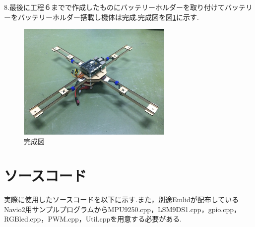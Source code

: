 \documentclass[12pt,oneside]{sotsuken_paper}
\begin{document}
\newpage

8.最後に工程６までで作成したものにバッテリーホルダーを取り付けてバッテリーをバッテリーホルダー搭載し機体は完成.完成図を図\ref{fig:kitai}に示す.

\begin{figure}[htbp]
	\begin{center}
		\includegraphics[width=75mm]{image/kitai/kitai.jpg}
		\caption{完成図}
		\label{fig:kitai}
	\end{center}
\end{figure}

\clearpage

\section{ソースコード}
実際に使用したソースコードを以下に示す.また，別途Emlidが配布しているNavio2用サンプルプログラムからMPU9250.cpp，LSM9DS1.cpp，gpio.cpp，RGBled.cpp，PWM.cpp，Util.cppを用意する必要がある.


\end{document}
